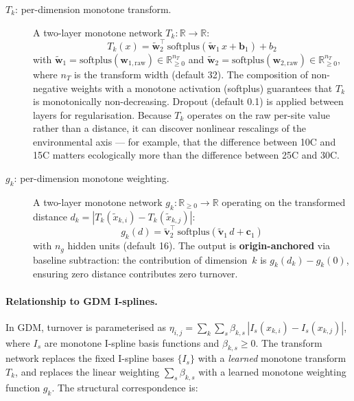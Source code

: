 \documentclass{article}
\begin{document}
\begin{description}
    \item[$T_k$: per-dimension monotone transform.] A two-layer monotone network $T_k: \mathbb{R} \to \mathbb{R}$:
    \begin{equation}
        T_k(x) = \tilde{\mathbf{w}}_2^\top\,\text{softplus}\!\left(\tilde{\mathbf{w}}_1\,x + \mathbf{b}_1\right) + b_2
    \end{equation}
    with $\tilde{\mathbf{w}}_1 = \text{softplus}(\mathbf{w}_{1,\text{raw}}) \in \mathbb{R}_{\geq 0}^{n_T}$ and $\tilde{\mathbf{w}}_2 = \text{softplus}(\mathbf{w}_{2,\text{raw}}) \in \mathbb{R}_{\geq 0}^{n_T}$, where $n_T$ is the transform width (default 32). The composition of non-negative weights with a monotone activation (softplus) guarantees that $T_k$ is monotonically non-decreasing. Dropout (default 0.1) is applied between layers for regularisation. Because $T_k$ operates on the raw per-site value rather than a distance, it can discover nonlinear rescalings of the environmental axis --- for example, that the difference between 10\textdegree C and 15\textdegree C matters ecologically more than the difference between 25\textdegree C and 30\textdegree C.
    
    \item[$g_k$: per-dimension monotone weighting.] A two-layer monotone network $g_k: \mathbb{R}_{\geq 0} \to \mathbb{R}$ operating on the transformed distance $d_k = |T_k(\tilde{x}_{k,i}) - T_k(\tilde{x}_{k,j})|$:
    \begin{equation}
        g_k(d) = \tilde{\mathbf{v}}_2^\top\,\text{softplus}\!\left(\tilde{\mathbf{v}}_1\,d + \mathbf{c}_1\right)
    \end{equation}
    with $n_g$ hidden units (default 16). The output is \textbf{origin-anchored} via baseline subtraction: the contribution of dimension~$k$ is $g_k(d_k) - g_k(0)$, ensuring zero distance contributes zero turnover.
\end{description}

\paragraph{Relationship to GDM I-splines.}
In GDM, turnover is parameterised as $\eta_{i,j} = \sum_k \sum_s \beta_{k,s}\,|I_s(x_{k,i}) - I_s(x_{k,j})|$, where $I_s$ are monotone I-spline basis functions and $\beta_{k,s} \geq 0$. The transform network replaces the fixed I-spline bases $\{I_s\}$ with a \emph{learned} monotone transform $T_k$, and replaces the linear weighting $\sum_s \beta_{k,s}$ with a learned monotone weighting function $g_k$. The structural correspondence is:
\end{document}
